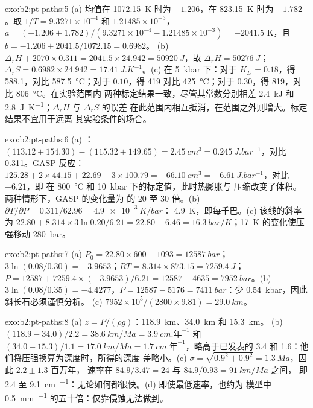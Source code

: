 \begin{solution}{exo:b2:pt-paths:5}
(a) 均值在 \qty{1072.15}{K} 时为 $-1.206$，在 \qty{823.15}{K} 时为 $-1.782$。取 $1/T =
9.3271\times10^{-4}$ 和 $1.21485\times10^{-3}$，$a = (-1.206 + 1.782)/(9.3271\times10^{-4}
- 1.21485\times10^{-3}) = -2041.5$ K，且 $b = -1.206 + 2041.5/1072.15 = 0.6982$。
(b) $\Delta_r H + 2070\times0.311 = 2041.5\times24.942 = \qty{50920}{J}$，故 $\Delta_r H =
\qty{50276}{J}$；$\Delta_r S = 0.6982\times24.942 = \qty{17.41}{J.K^{-1}}$。(c) 在
\qty{5}{kbar} 下：对于 $K_D = 0.18$，得 588.1，对比 \qty{587.5}{\celsius}；对于 $0.10$，得 419
对比 \qty{425}{\celsius}；对于 $0.30$，得 819，对比 \qty{806}{\celsius}。在实验范围内
两种标定结果一致，尽管其常数分别相差
\qty{2.4}{kJ} 和 \qty{2.8}{J.K^{-1}}；$\Delta_r H$ 与 $\Delta_r S$ 的误差
在此范围内相互抵消，在范围之外则增大。标定结果不宜用于远离
其实验条件的场合。
\end{solution}

\begin{solution}{exo:b2:pt-paths:6}
(a) ：$(113.12 + 154.30) - (115.32 + 149.65) = \qty{+2.45}{cm^3} =
\qty{0.245}{J.bar^{-1}}$，对比 0.311。GASP 反应：$125.28 + 2\times44.15 + 22.69 -
3\times100.79 = \qty{-66.10}{cm^3} = \qty{-6.61}{J.bar^{-1}}$，对比 $-6.21$，即
在 \qty{800}{\celsius} 和 \qty{10}{kbar} 下的标定值，此时热膨胀与
压缩改变了体积。两种情形下，GASP 的变化量为
的 20 至 30 倍。(b) $\partial T/\partial P = 0.311/62.96 = \qty{4.9e-3}{K/bar}$：
\qty{4.9}{K}，即每千巴。(c) 该线的斜率为 $22.80 + 8.314\times3\ln 0.20/6.21
= 22.80 - 6.46 = \qty{16.3}{bar/K}$；\qty{17}{K} 的变化使压强移动
\qty{280}{bar}。
\end{solution}

\begin{solution}{exo:b2:pt-paths:7}
(a) $P_0 = 22.80\times600 - 1093 = \qty{12587}{bar}$；$3\ln(0.08/0.30) = -3.9653$；$RT =
8.314\times873.15 = \qty{7259.4}{J}$；$P = 12587 + 7259.4\times(-3.9653)/6.21 = 12587 -
4635 = \qty{7952}{bar}$。(b) $3\ln(0.08/0.35) = -4.4277$，$P = 12587 - 5176 =
\qty{7411}{bar}$：少 \qty{0.54}{kbar}，因此斜长石必须谨慎分析。
(c) $7952\times10^5/(2800\times9.81) = \qty{29.0}{km}$。
\end{solution}

\begin{solution}{exo:b2:pt-paths:8}
(a) $z = P/(\bar\rho g)$：\qty{118.9}{km}、\qty{34.0}{km} 和 \qty{15.3}{km}。
(b) $(118.9 - 34.0)/2.2 = \qty{38.6}{km/Ma} = \qty{3.9}{cm.\text{年}^{-1}}$ 和 $(34.0 -
15.3)/1.1 = \qty{17.0}{km/Ma} = \qty{1.7}{cm.\text{年}^{-1}}$，略高于已发表的
3.4 和 1.6：他们将压强换算为深度时，所得的深度
差略小。(c) $\sigma = \sqrt{0.9^2 + 0.9^2} = \qty{1.3}{Ma}$，因此 $2.2 \pm 1.3$ 百万年，
速率在 $84.9/3.47 = 24$ 与 $84.9/0.93 = \qty{91}{km/Ma}$ 之间，
即 2.4 至 \qty{9.1}{cm.^{-1}}：无论如何都很快。(d) 即使最低速率，也约为
模型中 \qty{0.5}{mm.^{-1}} 的五十倍：仅靠侵蚀无法做到。
\end{solution}

